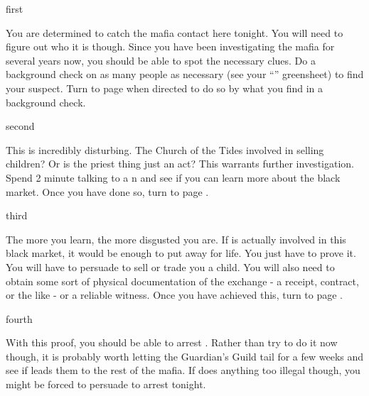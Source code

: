 \documentclass[greennotebook]{NeptuneBall}
\begin{document}

\startnotebook{\nMafia{}}

\begin{page}{first}

You are determined to catch the mafia contact here tonight. You will need to figure out who it is though. Since you have been investigating the mafia for several years now, you should be able to spot the necessary clues. Do a background check on as many people as necessary (see your ``\gBackground{\MYname}'' greensheet) to find your suspect. Turn to page  when directed to do so by what you find in a background check.

\end{page}

\begin{page}{second}

This is incredibly disturbing. The Church of the Tides involved in selling children? Or is the priest thing just an act? This warrants further investigation. Spend 2 minute talking to a \pPacifica{}n and see if you can learn more about the black market. Once you have done so, turn to page .

\end{page}

\begin{page}{third}

The more you learn, the more disgusted you are. If \cPriest{} is actually involved in this black market, it would be enough to put \cPriest{\them} away for life. You just have to prove it. You will have to persuade \cPriest{} to sell or trade you a child. You will also need to obtain some sort of physical documentation of the exchange - a receipt, contract, or the like - or a reliable witness. Once you have achieved this, turn to page .

\end{page}

\begin{page}{fourth}

With this proof, you should be able to arrest \cPriest{}. Rather than try to do it now though, it is probably worth letting the Guardian's Guild tail \cPriest{\them} for a few weeks and see if \cPriest{} leads them to the rest of the mafia. If \cPriest{} does anything too illegal though, you might be forced to persuade \cKing{} to arrest \cPriest{} tonight.

\end{page}

\endnotebook
\end{document}
